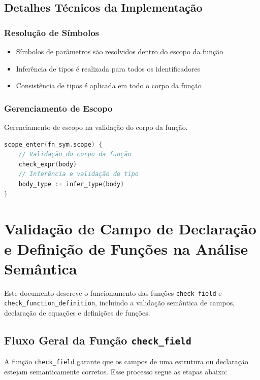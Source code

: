 \subsection{Detalhes Técnicos da Implementação}

\subsubsection{Resolução de Símbolos}
\begin{itemize}
    \item Símbolos de parâmetros são resolvidos dentro do escopo da função
    \item Inferência de tipos é realizada para todos os identificadores
    \item Consistência de tipos é aplicada em todo o corpo da função
\end{itemize}

\subsubsection{Gerenciamento de Escopo}
\begin{codigo}[htb]
    \caption{\small Gerenciamento de escopo na validação do corpo da função.}
    \label{cod-scope-management}
\begin{lstlisting}[language=C, numbers=none, frame=none, inputencoding=latin1]
scope_enter(fn_sym.scope) {
    // Validação do corpo da função
    check_expr(body)
    // Inferência e validação de tipo
    body_type := infer_type(body)
}
\end{lstlisting}
\end{codigo}
\section*{Validação de Campo de Declaração e Definição de Funções na Análise Semântica}

Este documento descreve o funcionamento das funções \texttt{check\_field} e \texttt{check\_function\_definition}, incluindo a validação semântica de campos, declaração de equações e definições de funções. 

\subsection*{Fluxo Geral da Função \texttt{check\_field}}

A função \texttt{check\_field} garante que os campos de uma estrutura ou declaração estejam semanticamente corretos. Esse processo segue as etapas abaixo:


